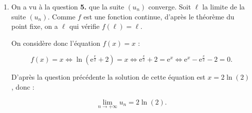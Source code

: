 \documentclass[10pt]{article}
\begin{document}
\begin{enumerate}
\begin{enumerate}
Posons $X = \text{e}^{\frac{x}{2}}$. On a alors :

\[\left(\text{e}^{\frac{x}{2}}\right)^{2} - \text{e}^{\frac{x}{2}} - 2 = 0 \iff X^{2} - X - 2 = 0\]

D'après la question précédente, les solutions de l'équation $X^{2} - X - 2 = 0$ sont

$X_{1} = -1$ et $X_{2} = 2$. On a donc :


\[\boxed{\mathcal{S} = \left\{2\ln (2)\strut\right\}}\]

		\item On a vu à la question \textbf{5.} que la suite $\left(u_{n}\right)$ converge. Soit $\ell$ la limite de la suite $\left(u_{n}\right)$. Comme $f$ est une fonction continue, d'après le théorème du point fixe, on a $\ell$ qui vérifie $f(\ell) = \ell$.

On considère donc l'équation $f(x) = x$ :

\[f(x) = x \iff \ln\left(\text{e}^{\frac{x}{2}} + 2\right) = x \iff \text{e}^{\frac{x}{2}} + 2 = \text{e}^{x} \iff \text{e}^{x} - \text{e}^{\frac{x}{2}} - 2 = 0.\]

D'après la question précédente la solution de cette équation est $x = 2\ln(2)$, donc :

\[\boxed{\lim_{n \to +\infty}u_{n} = 2\ln(2)}.\]
	\end{enumerate}
\end{enumerate}


\bigskip
\end{document}
